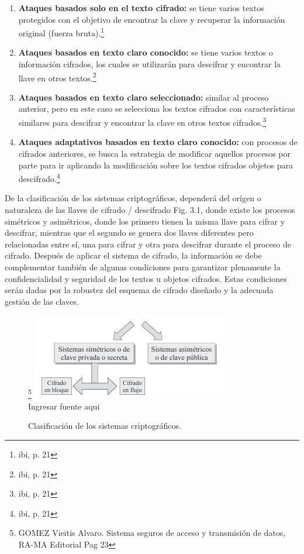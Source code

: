 \documentclass[a4paper,openright,12pt]{book}
\theoremstyle{definition}
\theoremstyle{remark}
\begin{document}
\begin{enumerate}
	\item \textbf{Ataques basados solo en el texto cifrado:}  se tiene varios textos protegidos con el objetivo de encontrar la clave y recuperar la información original (fuerza bruta).\footnote{ibi, p. 21}
    \item \textbf{Ataques basados en texto claro conocido:} se tiene varios textos o información cifrados, los cuales se utilizarán para descifrar y encontrar la llave en otros textos.\footnote{ibi, p.  21}
    \item \textbf{Ataques basados en texto claro seleccionado:} similar al proceso anterior, pero en este caso se selecciona los textos cifrados con características similares para descifrar y encontrar la clave en otros textos cifrados.\footnote{ibi, p. 21}
    \item \textbf{Ataques adaptativos basados en texto claro conocido: } con procesos de cifrados anteriores, se busca la estrategia de modificar aquellos procesos por parte para ir aplicando la modificación sobre los textos cifrados objetos para descifrado.\footnote{ibi, p. 21}
\end{enumerate}

De la clasificación de los sistemas criptográficos, dependerá del orígen o naturaleza de las llaves de cifrado / descifrado Fig. 3.1, donde existe los procesos simétricos y asimétricos, donde los primero tienen la misma llave para cifrar y descifrar, mientras que el segundo se genera dos llaves diferentes pero relacionadas entre sí, una para cifrar y otra para descifrar durante el proceso de cifrado. Después de aplicar el sistema de cifrado, la información se debe complementar también de algunas condiciones para garantizar plenamente la confidencialidad y seguridad de los textos u objetos cifrados. Estas condiciones serán dadas por la robustez del esquema de cifrado diseñado y la adecuada gestión de las claves.

\begin{figure}[htb]
\centering
\caption{Clasificación de los sistemas criptográficos.}\footnote{GOMEZ Vieitis Alvaro. Sistema seguros de acceso y transmisión de datos, RA-MA Editorial Pag 23}
\includegraphics[scale=0.8]{ClasificacionCripto}
\label{fig:ClasificacionCripto}
\\Ingresar fuente aqui
\end{figure}
\end{document}
